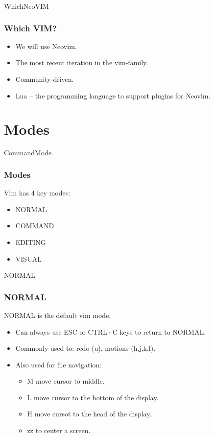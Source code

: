 \documentclass{beamer}
\begin{document}
\begin{frame}{WhichNeoVIM}
    \frametitle{Which VIM?}
    \begin{itemize}
        \item We will use Neovim.
        \item The most recent iteration in the vim-family.
        \item Community-driven.
        \item \textsf{Lua} -- the programming language to support plugins for Neovim.
    \end{itemize}
\end{frame}

\section{Modes}
\begin{frame}{CommandMode}
    \frametitle{Modes}
    Vim has 4 key modes:
    \begin{itemize}
        \item NORMAL
        \item COMMAND
        \item EDITING
        \item VISUAL
    \end{itemize}
\end{frame}

\begin{frame}{NORMAL}
    \frametitle{NORMAL}
    NORMAL is the default vim mode.
    \begin{itemize}
        \item Can always use ESC or CTRL+C keys to return to NORMAL.
        \item Commonly used to: redo (u), motions (h,j,k,l).
        \item Also used for file navigation:
            \begin{itemize}
                \item \textsf{M} move cursor to middle.
                \item \textsf{L} move cursor to the bottom of the display.
                \item \textsf{H} move cursot to the head of the display.
                \item \textsf{zz} to center a screen.
            \end{itemize}
    \end{itemize}
\end{frame}
\end{document}
